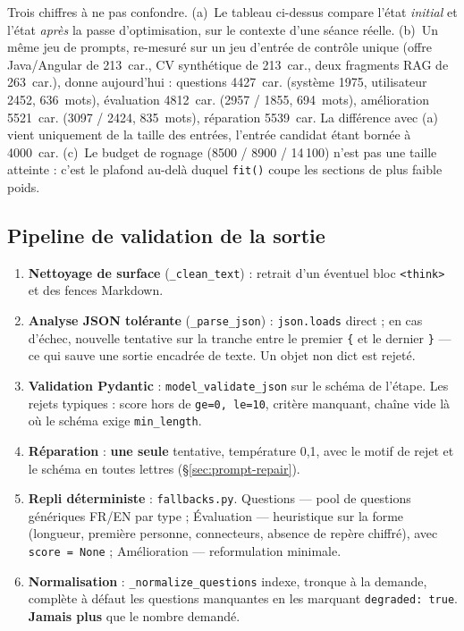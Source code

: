 Trois chiffres à ne pas confondre. (a)~Le tableau ci-dessus compare l'état
\emph{initial} et l'état \emph{après} la passe d'optimisation, sur le contexte
d'une séance réelle. (b)~Un même jeu de prompts, re-mesuré sur un jeu
d'entrée de contrôle unique (offre Java/Angular de 213~car., CV synthétique de
213~car., deux fragments RAG de 263~car.), donne aujourd'hui : questions
4427~car. (système 1975, utilisateur 2452, 636~mots), évaluation 4812~car.
(2957 / 1855, 694~mots), amélioration 5521~car. (3097 / 2424, 835~mots),
réparation 5539~car. La différence avec (a) vient uniquement de la taille des
entrées, l'entrée candidat étant bornée à 4000~car. (c)~Le budget de rognage
(8500 / 8900 / 14\,100) n'est pas une taille atteinte : c'est le plafond au-delà
duquel \texttt{fit()} coupe les sections de plus faible poids.

\subsection{Pipeline de validation de la sortie}
\label{sec:prompts-validation}

\begin{enumerate}[label=\arabic*.,leftmargin=*,itemsep=2pt]
  \item \textbf{Nettoyage de surface} (\texttt{\_clean\_text}) : retrait d'un
        éventuel bloc \verb|<think>| et des fences Markdown.
  \item \textbf{Analyse JSON tolérante} (\texttt{\_parse\_json}) : \texttt{json.loads}
        direct ; en cas d'échec, nouvelle tentative sur la tranche entre le premier
        \texttt{\{} et le dernier \texttt{\}} --- ce qui sauve une sortie encadrée
        de texte. Un objet non dict est rejeté.
  \item \textbf{Validation Pydantic} : \texttt{model\_validate\_json} sur le
        schéma de l'étape. Les rejets typiques : score hors de \texttt{ge=0, le=10},
        critère manquant, chaîne vide là où le schéma exige \texttt{min\_length}.
  \item \textbf{Réparation} : \textbf{une seule} tentative, température 0,1, avec
        le motif de rejet et le schéma en toutes lettres (§\ref{sec:prompt-repair}).
  \item \textbf{Repli déterministe} : \texttt{fallbacks.py}. Questions --- pool de
        questions génériques FR/EN par type ; Évaluation --- heuristique sur la
        forme (longueur, première personne, connecteurs, absence de repère chiffré),
        avec \texttt{score = None} ; Amélioration --- reformulation minimale.
  \item \textbf{Normalisation} : \texttt{\_normalize\_questions} indexe, tronque
        à la demande, complète à défaut les questions manquantes en les marquant
        \texttt{degraded: true}. \textbf{Jamais plus} que le nombre demandé.
\end{enumerate}

